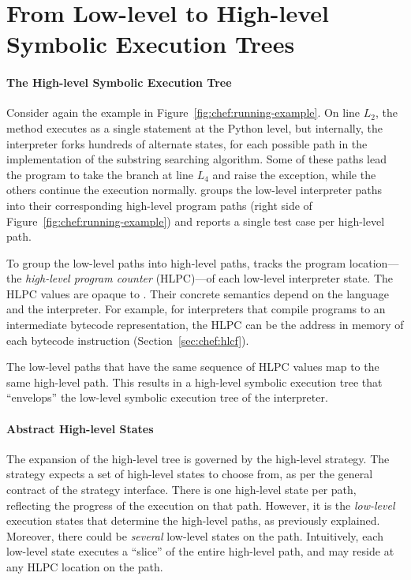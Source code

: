 \section{From Low-level to High-level Symbolic Execution Trees}

\paragraph{The High-level Symbolic Execution Tree}

Consider again the example in Figure~\ref{fig:chef:running-example}.
%
On line $L_2$, the  method executes as a single statement at the Python level, but internally, the interpreter forks hundreds of alternate states, for each possible path in the implementation of the substring searching algorithm.
%
Some of these paths lead the program to take the branch at line $L_4$ and raise the exception, while the others continue the execution normally.
%
\chef groups the low-level interpreter paths into their corresponding high-level program paths (right side of Figure~\ref{fig:chef:running-example}) and reports a single test case per high-level path.


To group the low-level paths into high-level paths, \chef tracks the program location---the \emph{high-level program counter} (HLPC)---of each low-level interpreter state.
%
The HLPC values are opaque to \chef.  Their concrete semantics depend on the language and the interpreter.  For example, for interpreters that compile programs to an intermediate bytecode representation, the HLPC can be the address in memory of each bytecode instruction (Section~\ref{sec:chef:hlcf}).

The low-level paths that have the same sequence of HLPC values map to the same high-level path.
%
This results in a high-level symbolic execution tree that ``envelops'' the low-level symbolic execution tree of the interpreter.

\paragraph{Abstract High-level States}

The expansion of the high-level tree is governed by the high-level strategy.
%
The strategy expects a set of high-level states to choose from, as per the general contract of the strategy interface.  There is one high-level state per path, reflecting the progress of the execution on that path.
%
However, it is the \emph{low-level} execution states that determine the high-level paths, as previously explained.
%
Moreover, there could be \emph{several} low-level states on the path.
Intuitively, each low-level state executes a ``slice'' of the entire high-level path, and may reside at any HLPC location on the path.


